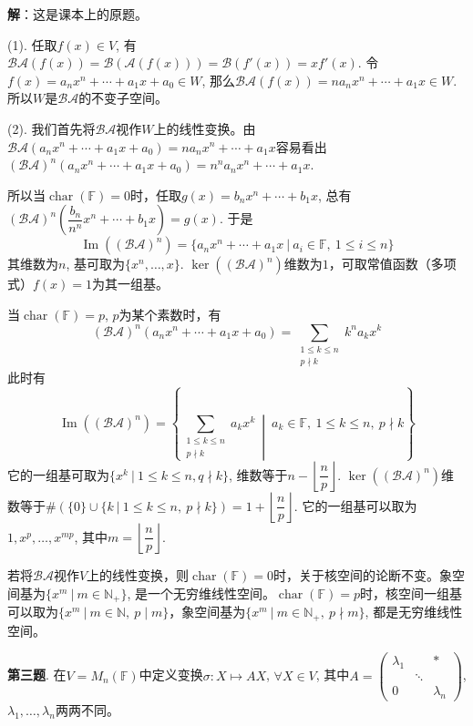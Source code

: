 {\bf 解}：这是课本上的原题。

(1). 任取$f(x) \in V$, 有$\mathscr{BA}(f(x)) = \mathscr{B}(\mathscr{A}(f(x))) = \mathscr{B}(f'(x)) = xf'(x)$. 令$f(x) = a_nx^n + \cdots + a_1x + a_0 \in W$, 那么$\mathscr{BA}(f(x)) = na_nx^n + \cdots + a_1x \in W$. 所以$W$是$\mathscr{BA}$的不变子空间。

(2). 我们首先将$\mathscr{BA}$视作$W$上的线性变换。由$\mathscr{BA}(a_nx^n + \cdots + a_1x + a_0) = na_nx^n + \cdots + a_1x$容易看出$(\mathscr{BA})^n(a_nx^n + \cdots + a_1x + a_0) = n^na_nx^n + \cdots + a_1x$.

所以当$\operatorname{char}(\mathbb{F}) = 0$时，任取$g(x) = b_nx^n + \cdots + b_1x$, 总有$(\mathscr{BA})^n\left(\dfrac{b_n}{n^n} x^n + \cdots + b_1x\right) = g(x).$ 于是
$$\operatorname{Im}((\mathscr{BA})^n) = \{ a_nx^n + \cdots + a_1x \ |\ a_i\in\mathbb{F},~ 1\leqslant i \leqslant n \}$$
其维数为$n$, 基可取为$\{x^n, \ldots, x\}$. $\ker((\mathscr{BA})^n)$维数为$1$，可取常值函数（多项式）$f(x) = 1$为其一组基。

当$\operatorname{char}(\mathbb{F}) = p$, $p$为某个素数时，有
$$(\mathscr{BA})^n(a_nx^n + \cdots + a_1x + a_0) = \sum_{\substack{1\leqslant k \leqslant n \\ p\nmid k}} k^n a_k x^k$$
此时有
$$\operatorname{Im}((\mathscr{BA})^n) = \left\{ \sum_{\substack{1\leqslant k \leqslant n \\ p\nmid k}} a_k x^k \ \middle|\ a_k\in\mathbb{F},~ 1\leqslant k \leqslant n, ~ p\nmid k \right\}$$
它的一组基可取为$\{ x^k \ |\ 1 \leqslant k \leqslant n, q\nmid k \}$, 维数等于$n - \left\lfloor \dfrac{n}{p} \right\rfloor$. $\ker((\mathscr{BA})^n)$维数等于$\# (\{ 0 \} \cup \{ k \ |\ 1\leqslant k \leqslant n, ~ p\nmid k \}) = 1 + \left\lfloor \dfrac{n}{p} \right\rfloor.$ 它的一组基可以取为$1, x^p, \ldots, x^{mp}$, 其中$m = \left\lfloor \dfrac{n}{p} \right\rfloor.$

若将$\mathscr{BA}$视作$V$上的线性变换，则$\operatorname{char}(\mathbb{F}) = 0$时，关于核空间的论断不变。象空间基为$\{x^m \ |\ m\in\mathbb{N}_+ \}$, 是一个无穷维线性空间。$\operatorname{char}(\mathbb{F}) = p$时，核空间一组基可以取为$\{ x^m \ |\ m\in\mathbb{N}, ~ p \mid m \}$，象空间基为$\{ x^m \ |\ m\in\mathbb{N}_+, ~ p \nmid m \}$, 都是无穷维线性空间。

\newpageorvspace


{\bf 第三题}. 在$V = M_n(\mathbb{F})$中定义变换$\sigma: X \mapsto AX$, $\forall X\in V$, 其中$A = \begin{pmatrix} \lambda_1 & & \ast \\ & \ddots & \\ 0 & & \lambda_n \end{pmatrix}$, $\lambda_1,\ldots,\lambda_n$两两不同。

